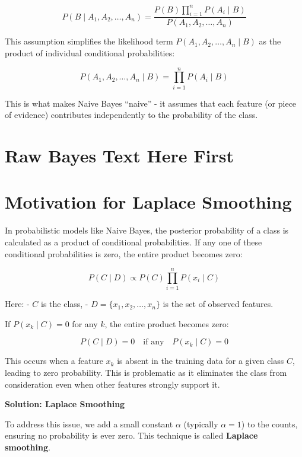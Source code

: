 \documentclass[
  12 pt,
  a4paper,
]{book}
\numberwithin{equation}{section}
\theoremstyle{plain}      %
\theoremstyle{definition} %
\theoremstyle{remark}     %
\theoremstyle{note}         %
\begin{document}
\[
P\left(B \mid A_1, A_2, \ldots, A_n\right)=\frac{P(B) \prod_{i=1}^n P\left(A_i \mid B\right)}{P\left(A_1, A_2, \ldots, A_n\right)}
\]

This assumption simplifies the likelihood term
\(P\left(A_1, A_2, \ldots, A_n \mid B\right)\) as the product of
individual conditional probabilities:

\[
P\left(A_1, A_2, \ldots, A_n \mid B\right)=\prod_{i=1}^n P\left(A_i \mid B\right)
\]

This is what makes Naive Bayes ``naive'' - it assumes that each feature
(or piece of evidence) contributes independently to the probability of
the class.

\newpage

\hypertarget{raw-bayes-text-here-first}{%
\section{Raw Bayes Text Here First}\label{raw-bayes-text-here-first}}

\newpage

\newpage

\hypertarget{motivation-for-laplace-smoothing}{%
\section{Motivation for Laplace
Smoothing}\label{motivation-for-laplace-smoothing}}

In probabilistic models like Naive Bayes, the posterior probability of a
class is calculated as a product of conditional probabilities. If any
one of these conditional probabilities is zero, the entire product
becomes zero:

\[
P(C \mid D) \propto P(C) \prod_{i=1}^n P(x_i \mid C)
\]

Here: - \(C\) is the class, - \(D = \{x_1, x_2, \dots, x_n\}\) is the
set of observed features.

If \(P(x_k \mid C) = 0\) for any \(k\), the entire product becomes zero:

\[
P(C \mid D) = 0 \quad \text{if any} \quad P(x_k \mid C) = 0
\]

This occurs when a feature \(x_k\) is absent in the training data for a
given class \(C\), leading to zero probability. This is problematic as
it eliminates the class from consideration even when other features
strongly support it.

\textbf{Solution: Laplace Smoothing}

To address this issue, we add a small constant \(\alpha\) (typically
\(\alpha = 1\)) to the counts, ensuring no probability is ever zero.
This technique is called \textbf{Laplace smoothing}.
\end{document}
